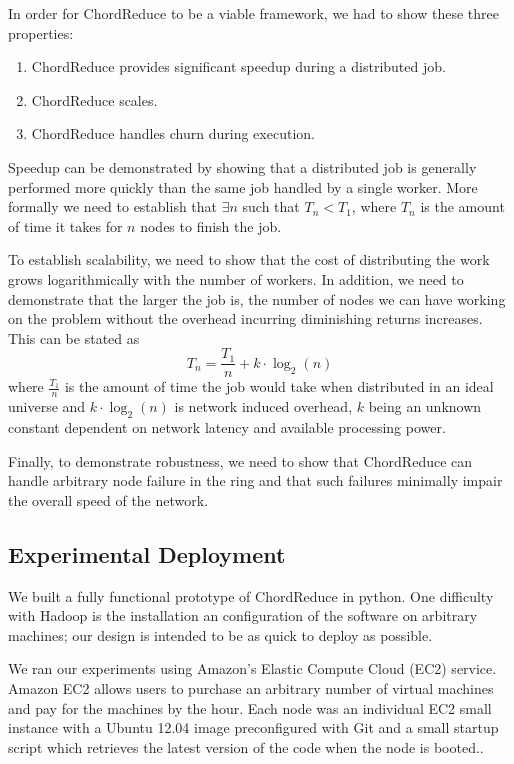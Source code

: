 \documentclass[10pt, conference, compsocconf]{IEEEtran}
\begin{document}
In order for ChordReduce to be a viable framework, we had to show these three properties:
\begin{enumerate}
    \item ChordReduce provides significant speedup during a distributed job.
    \item ChordReduce scales.
    \item ChordReduce handles churn during execution.
\end{enumerate}
Speedup can be demonstrated by showing that a distributed job is generally performed more quickly than the same job handled by a single worker.  More formally we need to establish that $\exists n$ such that $T_{n} < T_{1}$, where $T_{n}$ is the amount of time it takes for $n$ nodes to finish the job.

To establish scalability, we need to show that the cost of distributing the work grows logarithmically with the number of workers.  In addition, we need to demonstrate that the larger the job is, the number of nodes we can have working on the problem without the overhead incurring diminishing returns increases. This can be stated as $$T_{n} = \frac{T_{1}}{n} + k \cdot \log_{2}(n)$$ where $\frac{T_{1}}{n}$ is the amount of time the job would take when distributed in an ideal universe and $k \cdot \log_{2}(n)$ is network induced overhead, $k$ being an unknown constant dependent on network latency and available processing power.

Finally, to demonstrate robustness, we need to show that ChordReduce can handle arbitrary node failure in the ring and that such failures minimally impair the overall speed of the network.

\subsection{Experimental Deployment}
We built a fully functional prototype of ChordReduce in python.  One difficulty with Hadoop is the installation an configuration of the software on arbitrary machines;  our design is intended to be as quick to deploy as possible. 

We ran our experiments using Amazon's Elastic Compute Cloud (EC2) service.  Amazon EC2 allows users to purchase an arbitrary number of virtual machines and pay for the machines by the hour. Each node was an individual EC2 small instance \cite{amazon-instances} with a Ubuntu 12.04 image preconfigured with Git and a small startup script which retrieves the latest version of the code when the node is booted..  
\end{document}
